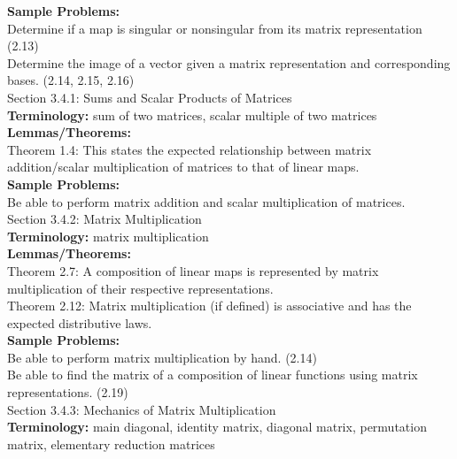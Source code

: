 \documentclass[11pt,fleqn]{article}
\begin{document}
\textbf{Sample Problems:} \\
Determine if a map is singular or nonsingular from its matrix representation (2.13)\\
Determine the image of a vector given a matrix representation and corresponding bases. (2.14, 2.15, 2.16)\\

\noindent Section 3.4.1: Sums and Scalar Products of Matrices \\

\textbf{Terminology:} sum of two matrices, scalar multiple of two matrices \\

\textbf{Lemmas/Theorems:} \\
Theorem 1.4: This states the expected relationship between matrix addition/scalar multiplication of matrices to that of linear maps.\\

\textbf{Sample Problems:} \\
Be able to perform matrix addition and scalar multiplication of matrices.\\

\noindent Section 3.4.2: Matrix Multiplication\\

\textbf{Terminology:} matrix multiplication \\

\textbf{Lemmas/Theorems:} \\
Theorem 2.7: A composition of linear maps is represented by matrix multiplication of their respective representations.\\
Theorem 2.12: Matrix multiplication (if defined) is associative and has the expected distributive laws.\\

\textbf{Sample Problems:} \\
Be able to perform matrix multiplication by hand. (2.14)\\
Be able to find the matrix of a composition of linear functions using matrix representations. (2.19)\\

\noindent Section 3.4.3: Mechanics of Matrix Multiplication\\

\textbf{Terminology:} main diagonal, identity matrix, diagonal matrix, permutation matrix, elementary reduction matrices \\
\end{document}
